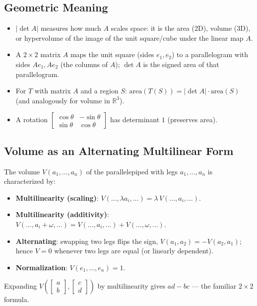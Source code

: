 \documentclass[hidelinks]{article}
\begin{document}
\subsection{Geometric Meaning}
\begin{itemize}
    \item $|\det A|$ measures how much $A$ scales space: it is the area (2D), volume (3D), or hypervolume of the image of the unit square/cube under the linear map $A$.
    \item A $2\times 2$ matrix $A$ maps the unit square (sides $e_1, e_2$) to a parallelogram with sides $Ae_1, Ae_2$ (the columns of $A$); $\det A$ is the signed area of that parallelogram.
    \item For $T$ with matrix $A$ and a region $S$: $\mathrm{area}(T(S)) = |\det A|\cdot\mathrm{area}(S)$ (and analogously for volume in $\mathbb{R}^3$).
    \item A rotation $\begin{bmatrix}\cos\theta & -\sin\theta\\ \sin\theta & \cos\theta\end{bmatrix}$ has determinant $1$ (preserves area).
\end{itemize}

\subsection{Volume as an Alternating Multilinear Form}
The volume $V(a_1,\ldots,a_n)$ of the parallelepiped with legs $a_1,\ldots,a_n$ is characterized by:
\begin{itemize}
    \item \textbf{Multilinearity (scaling)}: $V(\ldots,\lambda a_i,\ldots) = \lambda\, V(\ldots,a_i,\ldots)$.
    \item \textbf{Multilinearity (additivity)}: $V(\ldots,a_i + \omega,\ldots) = V(\ldots,a_i,\ldots) + V(\ldots,\omega,\ldots)$.
    \item \textbf{Alternating}: swapping two legs flips the sign, $V(a_1,a_2)=-V(a_2,a_1)$; hence $V=0$ whenever two legs are equal (or linearly dependent).
    \item \textbf{Normalization}: $V(e_1,\ldots,e_n) = 1$.
\end{itemize}
Expanding $V\!\left(\begin{bmatrix}a\\b\end{bmatrix},\begin{bmatrix}c\\d\end{bmatrix}\right)$ by multilinearity gives $ad-bc$ — the familiar $2\times 2$ formula.
\end{document}
